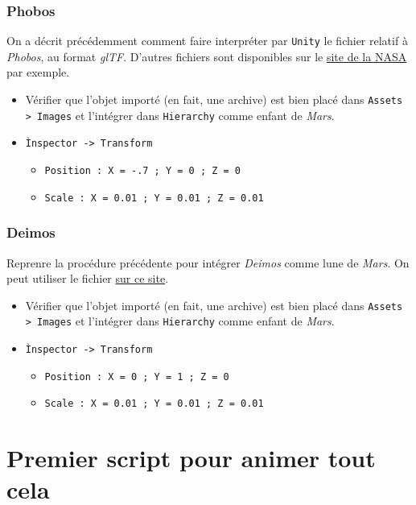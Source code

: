 \documentclass[a4paper,10pt]{article}
\newenvironment{solution}%
{\begin{tcolorbox}[breakable,colback=red!5!white,colframe=red!75!black,title=Solution]}%
{\end{tcolorbox}}
\begin{document}
\begin{solution}
\subsubsection{Phobos}
On a décrit précédemment comment faire interpréter par \texttt{Unity} le fichier relatif à \textit{Phobos}, au format \textit{glTF}. D'autres fichiers sont disponibles sur le \href{https://solarsystem.nasa.gov/resources/2358/phobos-3d-model/}{site de la NASA} par exemple.

\begin{itemize}
	\item  Vérifier que l'objet importé (en fait, une archive) est bien placé dans \texttt{Assets > Images} et l'intégrer dans  \texttt{Hierarchy} comme enfant de \textit{Mars}.
	\item \texttt{Ìnspector -> Transform}
	\begin{itemize}
		\item \texttt{Position : X = -.7 ; Y = 0 ; Z = 0 }
		\item \texttt{Scale : X = 0.01 ; Y = 0.01 ; Z = 0.01} 
	\end{itemize}	
\end{itemize}


\subsubsection{Deimos}
Reprenre la procédure précédente pour intégrer \textit{Deimos} comme lune de \textit{Mars}. On peut utiliser le fichier \href{https://science.nasa.gov/resource/deimos-mars-moon-3d-model/}{sur ce site}.

\begin{itemize}
	\item  Vérifier que l'objet importé (en fait, une archive) est bien placé dans \texttt{Assets > Images} et l'intégrer dans  \texttt{Hierarchy} comme enfant de \textit{Mars}.
	\item \texttt{Ìnspector -> Transform}
	\begin{itemize}
		\item \texttt{Position : X = 0 ; Y = 1 ; Z = 0 }
		\item \texttt{Scale : X = 0.01 ; Y = 0.01 ; Z = 0.01} 
	\end{itemize}	
\end{itemize}

\end{solution}
\fi 

\section{Premier script pour animer tout cela}
\end{document}
